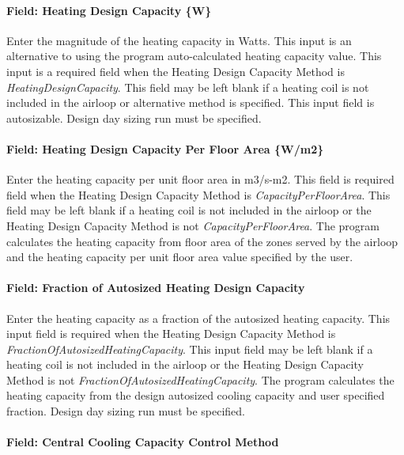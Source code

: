 \paragraph{Field: Heating Design Capacity \{W\}}\label{field-heating-design-capacity-w-1}

Enter the magnitude of the heating capacity in Watts. This input is an alternative to using the program auto-calculated heating capacity value. This input is a required field when the Heating Design Capacity Method is \emph{HeatingDesignCapacity}. This field may be left blank if a heating coil is not included in the airloop or alternative method is specified. This input field is autosizable. Design day sizing run must be specified.

\paragraph{Field: Heating Design Capacity Per Floor Area \{W/m2\}}\label{field-heating-design-capacity-per-floor-area-wm2-1}

Enter the heating capacity per unit floor area in m3/s-m2. This field is required field when the Heating Design Capacity Method is \emph{CapacityPerFloorArea}. This field may be left blank if a heating coil is not included in the airloop or the Heating Design Capacity Method is not \emph{CapacityPerFloorArea}. The program calculates the heating capacity from floor area of the zones served by the airloop and the heating capacity per unit floor area value specified by the user.

\paragraph{Field: Fraction of Autosized Heating Design Capacity}\label{field-fraction-of-autosized-heating-design-capacity-1}

Enter the heating capacity as a fraction of the autosized heating capacity. This input field is required when the Heating Design Capacity Method is \emph{FractionOfAutosizedHeatingCapacity}. This input field may be left blank if a heating coil is not included in the airloop or the Heating Design Capacity Method is not \emph{FractionOfAutosizedHeatingCapacity}. The program calculates the heating capacity from the design autosized cooling capacity and user specified fraction. Design day sizing run must be specified.

\paragraph{Field: Central Cooling Capacity Control Method}\label{field-central-cooling-capacity-control-method}

